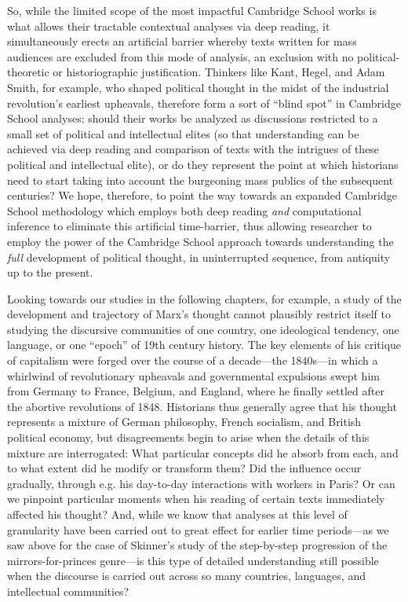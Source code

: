\documentclass[11pt]{article}
\begin{document}
So, while the limited scope of the most impactful Cambridge School works is what allows their tractable contextual analyses via deep reading, it simultaneously erects an artificial barrier whereby texts written for mass audiences are excluded from this mode of analysis, an exclusion with no political-theoretic or historiographic justification. Thinkers like Kant, Hegel, and Adam Smith, for example, who shaped political thought in the midst of the industrial revolution's earliest upheavals, therefore form a sort of ``blind spot'' in Cambridge School analyses: should their works be analyzed as discussions restricted to a small set of political and intellectual elites (so that understanding can be achieved via deep reading and comparison of texts with the intrigues of these political and intellectual elite), or do they represent the point at which historians need to start taking into account the burgeoning mass publics of the subsequent centuries? We hope, therefore, to point the way towards an expanded Cambridge School methodology which employs both deep reading \textit{and} computational inference to eliminate this artificial time-barrier, thus allowing researcher to employ the power of the Cambridge School approach towards understanding the \textit{full} development of political thought, in uninterrupted sequence, from antiquity up to the present.

Looking towards our studies in the following chapters, for example, a study of the development and trajectory of Marx's thought cannot plausibly restrict itself to studying the discursive communities of one country, one ideological tendency, one language, or one ``epoch'' of 19th century history. The key elements of his critique of capitalism were forged over the course of a decade---the 1840s---in which a whirlwind of revolutionary upheavals and governmental expulsions swept him from Germany to France, Belgium, and England, where he finally settled after the abortive revolutions of 1848. Historians thus generally agree that his thought represents a mixture of German philosophy, French socialism, and British political economy, but disagreements begin to arise when the details of this mixture are interrogated: What particular concepts did he absorb from each, and to what extent did he modify or transform them? Did the influence occur gradually, through e.g. his day-to-day interactions with workers in Paris? Or can we pinpoint particular moments when his reading of certain texts immediately affected his thought? And, while we know that analyses at this level of granularity have been carried out to great effect for earlier time periods---as we saw above for the case of Skinner's study of the step-by-step progression of the mirrors-for-princes genre---is this type of detailed understanding still possible when the discourse is carried out across so many countries, languages, and intellectual communities?
\end{document}
